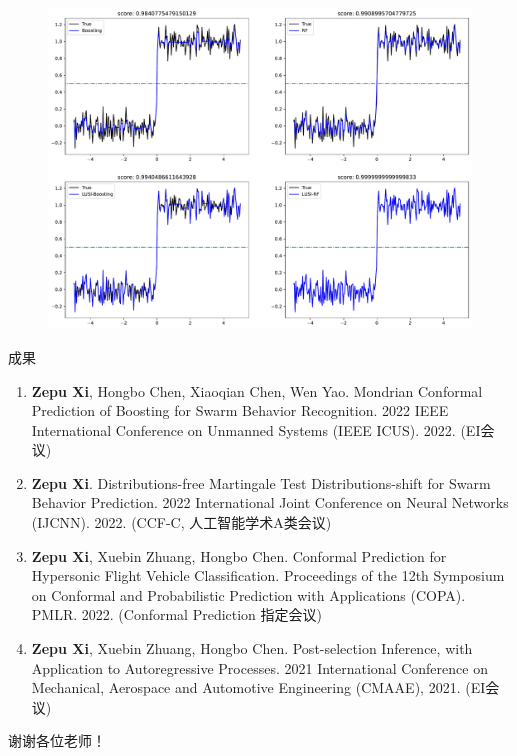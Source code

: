 \documentclass[compress,10pt,dvipsnames,notheorems]{beamer} %
\begin{document}
\begin{frame}
\begin{figure}[htbp]
\includegraphics[width=1\linewidth]{Imgs/LUSI_regression_Boosting_RF.pdf}
\end{figure}
\end{frame}

\begin{frame}{成果}
\begin{enumerate}
\item \textbf{Zepu Xi}, Hongbo Chen, Xiaoqian Chen, Wen Yao. Mondrian Conformal Prediction of Boosting for Swarm Behavior Recognition. 2022 IEEE International Conference on Unmanned Systems ({IEEE ICUS}). 2022. (EI会议)
\item \textbf{Zepu Xi}. Distributions-free Martingale Test Distributions-shift for Swarm Behavior Prediction. 2022 International Joint Conference on Neural Networks (IJCNN). 2022. (CCF-C, 人工智能学术A类会议)
\item \textbf{Zepu Xi}, Xuebin Zhuang, Hongbo Chen. Conformal Prediction for Hypersonic Flight Vehicle Classification. Proceedings of the 12th Symposium on Conformal and Probabilistic Prediction with Applications (COPA). PMLR. 2022. (Conformal Prediction 指定会议)
\item \textbf{Zepu Xi}, Xuebin Zhuang, Hongbo Chen. Post-selection Inference, with Application to Autoregressive Processes. 2021 International Conference on Mechanical, Aerospace and Automotive Engineering (CMAAE), 2021. (EI会议)
\end{enumerate}
\end{frame}

\begin{frame}
\vspace{0.12\textheight}\centering\Huge{谢谢各位老师！}\hspace{0em}
\end{frame}
\end{document}
